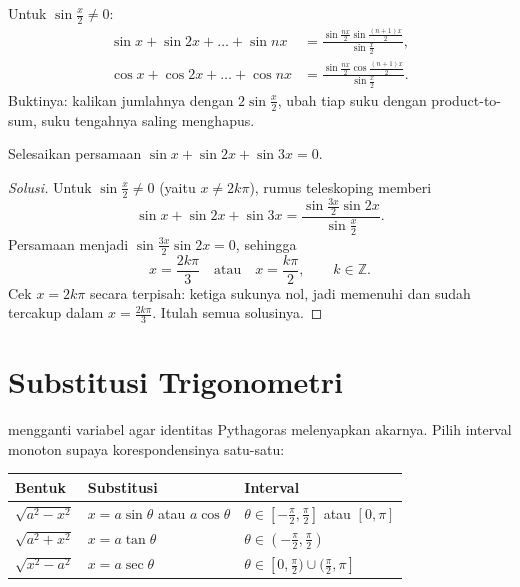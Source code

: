 \documentclass[12pt]{scrartcl}
\begin{document}
\begin{theorem}
Untuk $\sin\frac{x}{2} \ne 0$:
\begin{align*}
\sin x + \sin 2x + \dots + \sin nx
&= \frac{\sin\frac{nx}{2}\sin\frac{(n+1)x}{2}}{\sin\frac{x}{2}}, \\
\cos x + \cos 2x + \dots + \cos nx
&= \frac{\sin\frac{nx}{2}\cos\frac{(n+1)x}{2}}{\sin\frac{x}{2}}.
\end{align*}
Buktinya: kalikan jumlahnya dengan $2\sin\frac{x}{2}$, ubah tiap suku dengan
product-to-sum, suku tengahnya saling menghapus.
\end{theorem}

\begin{example}
Selesaikan persamaan $\sin x + \sin 2x + \sin 3x = 0$.
\end{example}
\begin{proof}[Solusi]
Untuk $\sin\frac{x}{2} \ne 0$ (yaitu $x \ne 2k\pi$), rumus teleskoping memberi
\[ \sin x + \sin 2x + \sin 3x
= \frac{\sin\frac{3x}{2}\sin 2x}{\sin\frac{x}{2}}. \]
Persamaan menjadi $\sin\frac{3x}{2}\sin 2x = 0$, sehingga
\[ x = \frac{2k\pi}{3} \quad \text{atau} \quad x = \frac{k\pi}{2},
\qquad k \in \mathbb{Z}. \]
Cek $x = 2k\pi$ secara terpisah: ketiga sukunya nol, jadi memenuhi dan sudah
tercakup dalam $x = \frac{2k\pi}{3}$. Itulah semua solusinya.
\end{proof}

\section{Substitusi Trigonometri}

\begin{fact}
 mengganti variabel
agar identitas Pythagoras melenyapkan akarnya. Pilih interval monoton supaya
korespondensinya satu-satu:
\begin{center}
\begin{tabular}{lll}
Bentuk & Substitusi & Interval \\
\hline
$\sqrt{a^2-x^2}$ & $x = a\sin\theta$ atau $a\cos\theta$ & $\theta \in [-\frac{\pi}{2}, \frac{\pi}{2}]$ atau $[0, \pi]$ \\
$\sqrt{a^2+x^2}$ & $x = a\tan\theta$ & $\theta \in (-\frac{\pi}{2}, \frac{\pi}{2})$ \\
$\sqrt{x^2-a^2}$ & $x = a\sec\theta$ & $\theta \in [0, \frac{\pi}{2}) \cup (\frac{\pi}{2}, \pi]$ \\
\end{tabular}
\end{center}
\end{fact}
\end{document}
